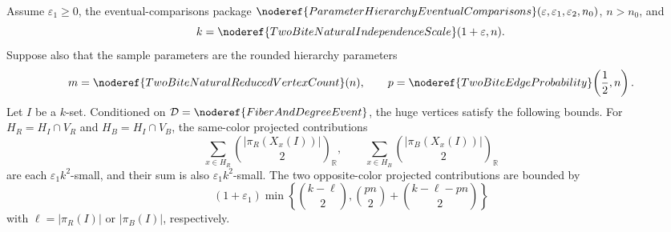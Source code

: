 \begin{lemma}
Assume \(\varepsilon_1\ge0\), the eventual-comparisons package
\(\noderef{ParameterHierarchyEventualComparisons}
(\varepsilon,\varepsilon_1,\varepsilon_2,n_0)\), \(n>n_0\), and
\[
k=\noderef{TwoBiteNaturalIndependenceScale}(1+\varepsilon,n).
\]
Suppose also that the sample parameters are the rounded hierarchy parameters
\[
m=\noderef{TwoBiteNaturalReducedVertexCount}(n),
\qquad
p=\noderef{TwoBiteEdgeProbability}\!\left(\frac12,n\right).
\]
Let \(I\) be a \(k\)-set.  Conditioned on
\(\mathcal D=\noderef{FiberAndDegreeEvent}\), the huge vertices satisfy the
following bounds.  For \(H_R=H_I\cap V_R\) and \(H_B=H_I\cap V_B\), the
same-color projected contributions
\[
\sum_{x\in H_R}\binom{|\pi_R(X_x(I))|}{2}_{\mathbb R},
\qquad
\sum_{x\in H_B}\binom{|\pi_B(X_x(I))|}{2}_{\mathbb R}
\]
are each \(\varepsilon_1k^2\)-small, and their sum is also
\(\varepsilon_1k^2\)-small.  The two opposite-color projected contributions
are bounded by
\[
(1+\varepsilon_1)\min\left\{\binom{k-\ell}{2},
\binom{pn}{2}+\binom{k-\ell-pn}{2}\right\}
\]
with \(\ell=|\pi_R(I)|\) or \(|\pi_B(I)|\), respectively.
\end{lemma}
